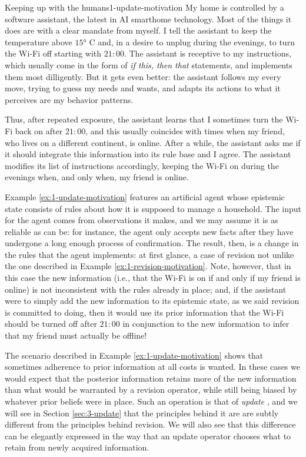 \begin{xmpl}{Keeping up with the humans}{1-update-motivation}
	My home is controlled by a software assistant,
	the latest in AI smarthome technology.
	Most of the things it does are with a clear mandate from myself.
	I tell the assistant to keep the temperature above $15\si{\degree}$ C and,
	in a desire to unplug during the evenings, to turn the Wi-Fi off starting 
	with $21{:}00$.
	The assistant is receptive to my instructions,
	which usually come in the form of \emph{if this, then that} statements,
	and implements them most dilligently.
	But it gets even better: the assistant follows my every move, 
	trying to guess my needs and wants,
	and adapts its actions to what it perceives are my behavior patterns.

	Thus, after repeated exposure, the assistant learns
	that I sometimes turn the Wi-Fi back on after $21{:}00$, and this
	usually coincides with times when my friend, who lives 
	on a different continent, is online.
	After a while, the assistant asks me if it should integrate 
	this information into its rule base and I agree.
	The assistant modifies its list of instructions accordingly,
	keeping the Wi-Fi on during the evenings when, 
	and only when, my friend is online.
\end{xmpl}

Example \ref{ex:1-update-motivation} features an artificial agent 
whose epistemic state consists of rules about how it is supposed 
to manage a household.
The input for the agent comes from observations it makes, 
and we may assume it is as reliable as can be: 
for instance, the agent only accepts new facts after they have undergone
a long enough process of confirmation.
The result, then, is a change in the rules that the agent implements:
at first glance, a case of revision not unlike the one described 
in Example \ref{ex:1-revision-motivation}.
Note, however, that in this case the new information
(i.e., that the Wi-Fi is on if and only if my friend is online)
is not inconsistent with the rules already in place;
and, if the assistant were to simply add the new information to its 
epistemic state, as we said revision is committed to doing,
then it would use its prior information that the Wi-Fi 
should be turned off after $21{:}00$ in conjunction to the new information 
to infer that my friend must actually be offline!

The scenario described in Example \ref{ex:1-update-motivation}
shows that sometimes adherence to prior information 
at all costs is wanted.
In these cases we would expect that the posterior information 
retains more of the new information than what would be warranted 
by a revision operator, 
while still being biased by whatever prior beliefs 
were in place.
Such an operation is that of \emph{update} \cite{KatsunoM91}, 
and we will see in Section \ref{sec:3-update} that the principles 
behind it are are subtly different from the principles behind revision.
We will also see that this difference can be elegantly expressed
in the way that an update operator chooses what to 
retain from newly acquired information.

